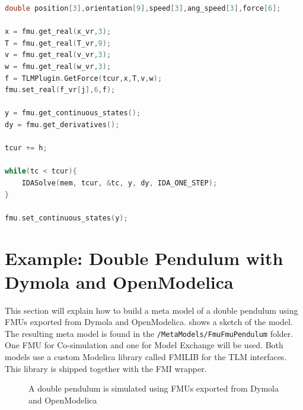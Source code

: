 \documentclass[a4paper,12pt]{include/opencpsreport}
\begin{document}
\begin{lstlisting}[language=c++, basicstyle=\ttfamily\small,floatplacement=h,caption=Pseudo code for the simulation loop with FMI for model exchange,label=lst:wrapper_me]
double position[3],orientation[9],speed[3],ang_speed[3],force[6];

x = fmu.get_real(x_vr,3);
T = fmu.get_real(T_vr,9);
v = fmu.get_real(v_vr,3);
w = fmu.get_real(w_vr,3);
f = TLMPlugin.GetForce(tcur,x,T,v,w);
fmu.set_real(f_vr[j],6,f);

y = fmu.get_continuous_states();
dy = fmu.get_derivatives();

tcur += h;

while(tc < tcur){
    IDASolve(mem, tcur, &tc, y, dy, IDA_ONE_STEP);
}

fmu.set_continuous_states(y);
\end{lstlisting}

\clearpage
\section{Example: Double Pendulum with Dymola and OpenModelica}
This section will explain how to build a meta model of a double pendulum using FMUs exported from Dymola and OpenModelica.
 shows a sketch of the model.
The resulting meta model is found in the \texttt{/MetaModels/FmuFmuPendulum} folder.
One FMU for Co-simulation and one for Model Exchange will be used.
Both models use a custom Modelica library called FMILIB for the TLM interfaces.
This library is shipped together with the FMI wrapper.

\begin{figure}[ht]
\centering
{}
\caption{A double pendulum is simulated using FMUs exported from Dymola and OpenModelica}
\label{fig:double_pendulum}
\end{figure}
\end{document}

